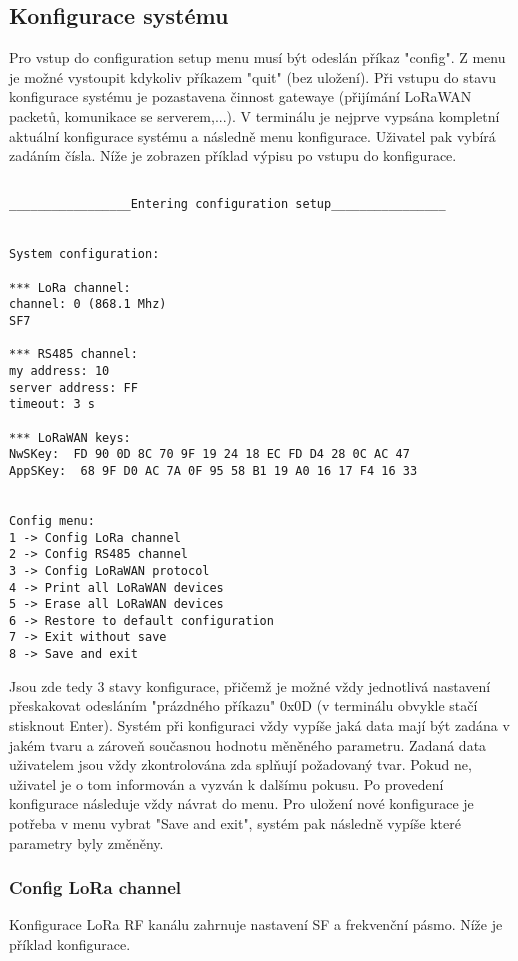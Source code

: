 \subsection{Konfigurace systému}
Pro vstup do configuration setup menu musí být odeslán příkaz "config". Z menu je možné vystoupit kdykoliv příkazem "quit" (bez uložení). 
Při vstupu do stavu konfigurace systému je pozastavena činnost gatewaye (přijímání LoRaWAN packetů, komunikace se serverem,...).
V terminálu je nejprve vypsána kompletní aktuální konfigurace systému a následně menu konfigurace. Uživatel pak vybírá zadáním čísla.
Níže je zobrazen příklad výpisu po vstupu do konfigurace.
\\

\begin{lstlisting}

_________________Entering configuration setup________________


System configuration:

*** LoRa channel: 
channel: 0 (868.1 Mhz)
SF7

*** RS485 channel: 
my address: 10
server address: FF
timeout: 3 s

*** LoRaWAN keys: 
NwSKey:  FD 90 0D 8C 70 9F 19 24 18 EC FD D4 28 0C AC 47
AppSKey:  68 9F D0 AC 7A 0F 95 58 B1 19 A0 16 17 F4 16 33


Config menu:
1 -> Config LoRa channel
2 -> Config RS485 channel
3 -> Config LoRaWAN protocol
4 -> Print all LoRaWAN devices
5 -> Erase all LoRaWAN devices
6 -> Restore to default configuration
7 -> Exit without save
8 -> Save and exit
\end{lstlisting}



Jsou zde tedy 3 stavy konfigurace, přičemž je možné vždy jednotlivá nastavení přeskakovat odesláním "prázdného příkazu" 0x0D (v terminálu obvykle stačí stisknout Enter). Systém při konfiguraci vždy vypíše jaká data mají být zadána v jakém tvaru a zároveň současnou hodnotu měněného parametru. Zadaná data uživatelem jsou vždy zkontrolována zda splňují požadovaný tvar. Pokud ne, uživatel je o tom informován a vyzván k dalšímu pokusu.
Po provedení konfigurace následuje vždy návrat do menu. Pro uložení nové konfigurace je potřeba v menu vybrat "Save and exit", systém pak následně vypíše které parametry byly změněny.

\subsubsection{Config LoRa channel}
Konfigurace LoRa RF kanálu zahrnuje nastavení SF a frekvenční pásmo. Níže je příklad konfigurace.

